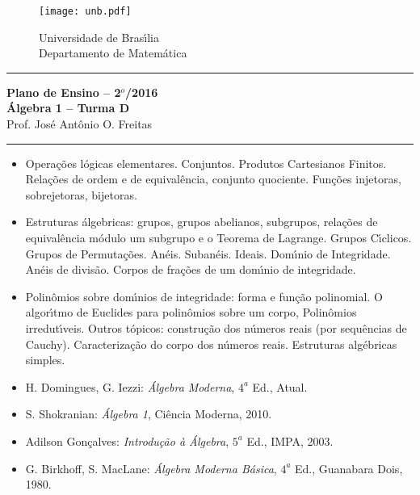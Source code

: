 \documentclass[12pt]{article}
\begin{document}
\pagestyle{empty}

\begin{figure}[h]
    \begin{minipage}[c]{1.7cm}
    \texttt{[image: unb.pdf]}
    \end{minipage}%
    \hspace{0pt}
    \begin{minipage}[c]{4in}
    {Universidade de Bras{\'\i}lia} \\
    {Departamento de Matem{\'a}tica}
    \end{minipage}
\end{figure}
\vspace{-0.9cm}
\hrule

\begin{center}
{\large\bf Plano de Ensino -- 2$^{o}$/2016} \\
{\large\bf \'Algebra 1 -- Turma D}\\
Prof. Jos{\'e} Ant{\^o}nio O. Freitas
\end{center}
\hrule
\vspace{0.25cm}
\begin{itemize}

\item Opera\c{c}\~oes l\'ogicas elementares. Conjuntos. Produtos Cartesianos Finitos. Rela\c{c}\~oes de ordem e de equival\^encia, conjunto quociente. Fun\c{c}\~oes injetoras, sobrejetoras, bijetoras.

\item Estruturas \'algebricas: grupos, grupos abelianos, subgrupos, rela\c{c}\~oes de equival\^encia m\'odulo um subgrupo e o Teorema de Lagrange. Grupos C{\'\i}clicos. Grupos de Permuta\c{c}\~oes. An\'eis. Suban\'eis. Ideais. Dom{\'\i}nio de Integridade. An\'eis de divis\~ao. Corpos de fra\c{c}\~oes de um dom{\'\i}nio de integridade.

\item Polin\^omios sobre dom{\'\i}nios de integridade: forma e fun\c{c}\~ao polinomial. O algor{\'\i}tmo de Euclides para polin\^omios sobre um corpo, Polin\^omios irredut{\'\i}veis. Outros t\'opicos: constru\c{c}\~ao dos n\'umeros reais (por sequ\^encias de Cauchy). Caracteriza\c{c}\~ao do corpo dos n\'umeros reais. Estruturas alg\'ebricas simples.
\end{itemize}

\vspace{0.5cm}
\begin{itemize}

\item H. Domingues, G. Iezzi: {\it {\'A}lgebra Moderna}, $4^a$
  Ed., Atual.

\item S. Shokranian: {\it {\'A}lgebra 1}, Ci{\^e}ncia Moderna, 2010.

\item Adilson Gon{\c c}alves: {\it Introdu{\c c}{\~a}o {\`a} {\'A}lgebra}, $5^a$ Ed., IMPA,
  2003.

\item G. Birkhoff, S. MacLane: {\it {\'A}lgebra Moderna B{\'a}sica}, $4^a$ Ed.,
  Guanabara Dois, 1980.

\end{itemize}
\end{document}
